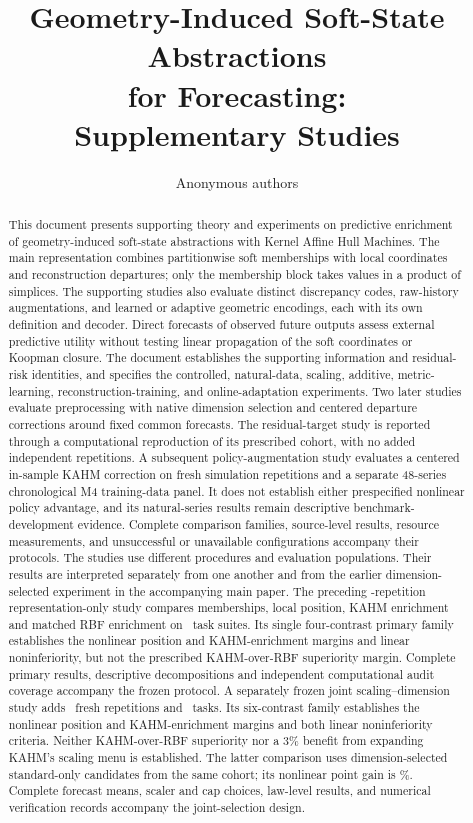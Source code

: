 \documentclass[10pt]{article}
\title{Geometry-Induced Soft-State Abstractions\\
for Forecasting:\\Supplementary Studies}
\author{Anonymous authors}
\begin{document}
\maketitle
\begin{abstract}
This document presents supporting theory and experiments on predictive
enrichment of geometry-induced soft-state abstractions with Kernel Affine
Hull Machines. The main representation combines partitionwise soft
memberships with local coordinates and reconstruction departures; only
the membership block takes values in a product of simplices. The
supporting studies also evaluate distinct discrepancy codes, raw-history
augmentations, and learned or adaptive geometric encodings, each with
its own definition and decoder. Direct forecasts of observed future
outputs assess external predictive utility without testing linear
propagation of the soft coordinates or Koopman closure.
The document establishes the supporting information and residual-risk
identities, and specifies the controlled, natural-data, scaling, additive,
metric-learning, reconstruction-training, and online-adaptation experiments.
Two later studies evaluate preprocessing with native dimension selection
and centered departure corrections around fixed common forecasts. The
residual-target study is reported through a computational reproduction
of its prescribed cohort, with no added independent repetitions.
A subsequent policy-augmentation study evaluates a centered in-sample
KAHM correction on fresh simulation repetitions and a separate
48-series chronological M4 training-data panel. It does not establish
either prespecified nonlinear policy advantage, and its natural-series
results remain descriptive benchmark-development evidence.
Complete comparison families, source-level results, resource measurements,
and unsuccessful or unavailable configurations accompany their protocols.
The studies use different procedures and evaluation populations. Their
results are interpreted separately from one another and from the
earlier dimension-selected experiment in the accompanying main paper.
The preceding \SARepetitions-repetition representation-only study compares
memberships, local position, KAHM enrichment and matched RBF enrichment
on \SATasks\ task suites. Its single four-contrast primary family
establishes the nonlinear position and KAHM-enrichment margins and
linear noninferiority, but not the prescribed KAHM-over-RBF superiority
margin. Complete primary results, descriptive decompositions and
independent computational audit coverage accompany the frozen protocol.
A separately frozen joint scaling--dimension study adds \JSRepetitions\
fresh repetitions and \JSTasks\ tasks. Its six-contrast family establishes
the nonlinear position and KAHM-enrichment margins and both linear
noninferiority criteria. Neither KAHM-over-RBF superiority nor a 3\%
benefit from expanding KAHM's scaling menu is established. The latter
comparison uses dimension-selected standard-only candidates from the
same cohort; its nonlinear point gain is \JSGainJointKNonlinear\%.
Complete forecast means, scaler and cap choices, law-level results,
and numerical verification records accompany the joint-selection design.
\end{abstract}
\end{document}
